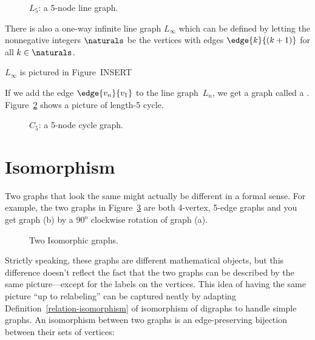 \begin{figure}


\caption{$L_5$: a 5-node line graph.}

\label{fig:graph_L_5}

\end{figure}

There is also a one-way infinite line graph $L_{\infty}$ which can be
defined by letting the nonnegative integers $\naturals$ be the vertices
with edges $\edge{k}{(k+1)}$ for all $k \in \naturals$.
\begin{editingnotes}
$L_{\infty}$ is pictured in Figure~INSERT%
\end{editingnotes}

If we add the edge $\edge{v_n}{v_1}$ to the line graph~$L_n$, we get a
graph called a  .
Figure~\ref{fig:graph_C_5} shows a picture of length-5 cycle.

\begin{figure}


\caption{$C_5$: a 5-node cycle graph.}
\label{fig:graph_C_5}
\end{figure}

\section{Isomorphism}
Two graphs that look the same might actually be different in a formal
sense.  For example, the two graphs in Figure~\ref{fig:isomorphic-C4cross}
are both 4-vertex, 5-edge graphs and you get graph (b) by a
$90^{\text{o}}$ clockwise rotation of graph (a).
\begin{figure}

\qquad
{}

\caption{Two Isomorphic graphs.}
\label{fig:isomorphic-C4cross}
\end{figure}

Strictly speaking, these graphs are different mathematical objects,
but this difference doesn't reflect the fact that the two graphs can
be described by the same picture---except for the labels on the
vertices.  This idea of having the same picture ``up to relabeling''
can be captured neatly by adapting
Definition~\ref{relation-isomorphism} of isomorphism of digraphs to
handle simple graphs.  An isomorphism between two graphs is an
edge-preserving bijection between their sets of vertices:

